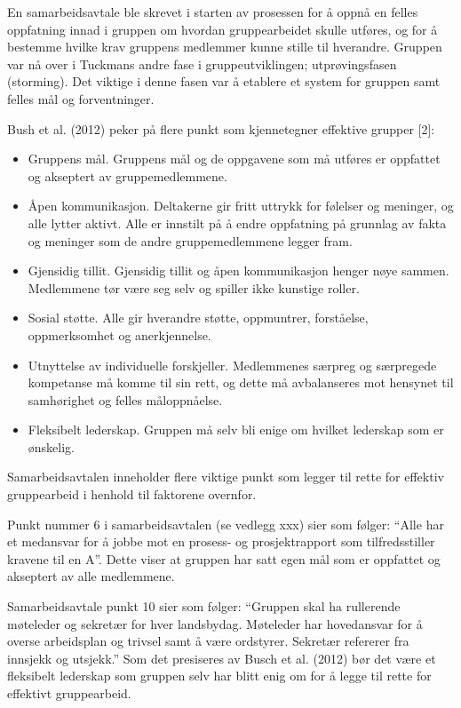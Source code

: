 En samarbeidsavtale ble skrevet i starten av prosessen for å oppnå en felles oppfatning innad i gruppen om hvordan gruppearbeidet skulle utføres, og for å bestemme hvilke krav gruppens medlemmer kunne stille til hverandre. Gruppen var nå over i Tuckmans andre fase i gruppeutviklingen; utprøvingsfasen (storming). Det viktige i denne fasen var å etablere et system for gruppen samt felles mål og forventninger. 

Bush et al. (2012) peker på flere punkt som kjennetegner effektive grupper [2]:

\begin{itemize}
	\item Gruppens mål. Gruppens mål og de oppgavene som må utføres er oppfattet og akseptert av gruppemedlemmene.
	\item Åpen kommunikasjon. Deltakerne gir fritt uttrykk for følelser og meninger, og alle lytter aktivt. Alle er innstilt på å endre oppfatning på grunnlag av fakta og meninger som de andre gruppemedlemmene legger fram.
	\item Gjensidig tillit. Gjensidig tillit og åpen kommunikasjon henger nøye sammen. Medlemmene tør være seg selv og spiller ikke kunstige roller.
	\item Sosial støtte. Alle gir hverandre støtte, oppmuntrer, forståelse, oppmerksomhet og anerkjennelse.
	\item Utnyttelse av individuelle forskjeller. Medlemmenes særpreg og særpregede kompetanse må komme til sin rett, og dette må avbalanseres mot hensynet til samhørighet og felles måloppnåelse.
	\item Fleksibelt lederskap. Gruppen må selv bli enige om hvilket lederskap som er ønskelig.
\end{itemize}

Samarbeidsavtalen inneholder flere viktige punkt som legger til rette for effektiv gruppearbeid i henhold til faktorene overnfor. 

Punkt nummer 6 i samarbeidsavtalen (se vedlegg xxx) sier som følger: “Alle har et medansvar for å jobbe mot en prosess- og prosjektrapport som tilfredsstiller kravene til en A”. Dette viser at gruppen har satt egen mål som er oppfattet og akseptert av alle medlemmene.

Samarbeidsavtale punkt 10 sier som følger: “Gruppen skal ha rullerende møteleder og sekretær for hver landsbydag. Møteleder har hovedansvar for å overse arbeidsplan og trivsel samt å være ordstyrer. Sekretær refererer fra innsjekk og utsjekk.” Som det presiseres av Busch et al. (2012) bør det være et fleksibelt lederskap som gruppen selv har blitt enig om for å legge til rette for effektivt gruppearbeid.

